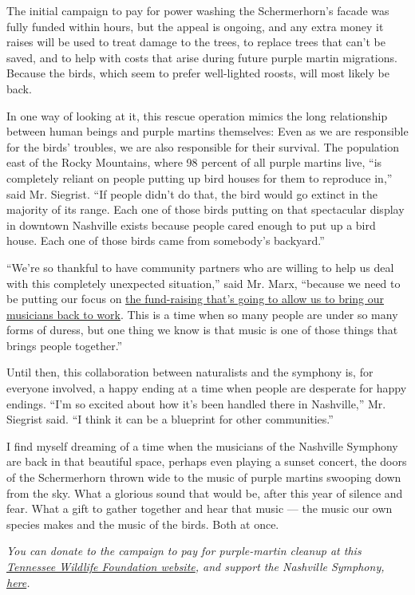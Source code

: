 The initial campaign to pay for power washing the Schermerhorn's facade
was fully funded within hours, but the appeal is ongoing, and any extra
money it raises will be used to treat damage to the trees, to replace
trees that can't be saved, and to help with costs that arise during
future purple martin migrations. Because the birds, which seem to prefer
well-lighted roosts, will most likely be back.

In one way of looking at it, this rescue operation mimics the long
relationship between human beings and purple martins themselves: Even as
we are responsible for the birds' troubles, we are also responsible for
their survival. The population east of the Rocky Mountains, where 98
percent of all purple martins live, ``is completely reliant on people
putting up bird houses for them to reproduce in,'' said Mr. Siegrist.
``If people didn't do that, the bird would go extinct in the majority of
its range. Each one of those birds putting on that spectacular display
in downtown Nashville exists because people cared enough to put up a
bird house. Each one of those birds came from somebody's backyard.''

``We're so thankful to have community partners who are willing to help
us deal with this completely unexpected situation,'' said Mr. Marx,
``because we need to be putting our focus on
\href{https://www.nashvillesymphony.org/contribute/donate-now/}{the
fund-raising that's going to allow us to bring our musicians back to
work}. This is a time when so many people are under so many forms of
duress, but one thing we know is that music is one of those things that
brings people together.''

Until then, this collaboration between naturalists and the symphony is,
for everyone involved, a happy ending at a time when people are
desperate for happy endings. ``I'm so excited about how it's been
handled there in Nashville,'' Mr. Siegrist said. ``I think it can be a
blueprint for other communities.''

I find myself dreaming of a time when the musicians of the Nashville
Symphony are back in that beautiful space, perhaps even playing a sunset
concert, the doors of the Schermerhorn thrown wide to the music of
purple martins swooping down from the sky. What a glorious sound that
would be, after this year of silence and fear. What a gift to gather
together and hear that music --- the music our own species makes and the
music of the birds. Both at once.

\emph{You can donate to the campaign to pay for purple-martin cleanup at
this} \href{https://act.tnwf.org/a/purple-martins}{\emph{Tennessee
Wildlife Foundation website}}\emph{, and support the Nashville
Symphony,}
\href{https://www.nashvillesymphony.org/contribute/donate-now/}{\emph{here}}\emph{.}

